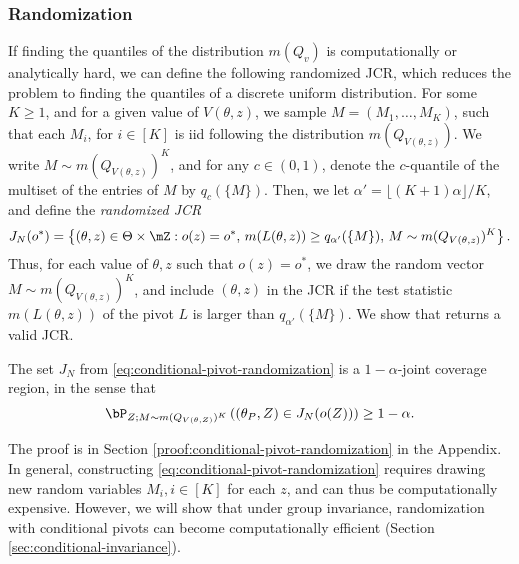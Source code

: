 \documentclass[english]{article}
\begin{document}
\subsubsection{Randomization}
If finding the quantiles of the distribution $m(Q_v)$
is computationally or analytically hard, 
we can define the following randomized JCR, which reduces the problem to finding the quantiles of a discrete uniform distribution.
For some $K\ge 1$, and for a given value of 
$V(\theta,z)$, we sample 
$M=(M_1,\ldots, M_K)$,
such that each $M_i$, for $i\in [K]$
is iid following the distribution $m(Q_{V(\theta,z)})$.
We write
$M\sim m(Q_{V(\theta,z)})^K$,
and
for any $c\in(0,1)$, denote the 
$c$-quantile of the multiset of the entries of $M$
by $q_c(\{M\})$.
Then, we let  
$\alpha' = \lfloor (K + 1)\alpha\rfloor/K$, and define
the \emph{randomized JCR}
\begin{align}\label{eq:conditional-pivot-randomization}
    J_{N}(o^*)= \left\{(\theta,z) 
\in\Theta\times\mZ: 
o(z) = o^*,\,
m(L(\theta,z)) \ge q_{\alpha'}(\{M\}),\,
M\sim m(Q_{V(\theta,z)})^K\right\}.
\end{align}
Thus, for each value of $\theta,z$ such that $o(z)=o^*$, we draw the random vector 
$M\sim m(Q_{V(\theta,z)})^K$, 
and include $(\theta,z)$ in the JCR
if the test statistic $m(L(\theta,z))$ of the pivot
$L$ is larger than $q_{\alpha'}(\{M\})$.
We show that returns a valid JCR.
\begin{theorem}\label{thm:conditional-pivot-randomization}
The set $ J_{N}$ from  \eqref{eq:conditional-pivot-randomization} is a $1-\alpha$-joint coverage region, in the sense that
    \begin{align*}
        \bP_{Z;M \sim m(Q_{V(\theta,Z)})^K}\left((\theta_P,Z) \in J_{N}(o(Z))\right) \ge 1 - \alpha.
    \end{align*}
\end{theorem}
 The proof is in Section \ref{proof:conditional-pivot-randomization} in the Appendix.
In general, constructing \eqref{eq:conditional-pivot-randomization}
requires drawing new random variables $M_i, i\in [K]$ for each $z$, and can thus be computationally expensive.
However,
we will show that  under group invariance, 
randomization with conditional pivots can become computationally efficient (Section \ref{sec:conditional-invariance}). 
\end{document}
